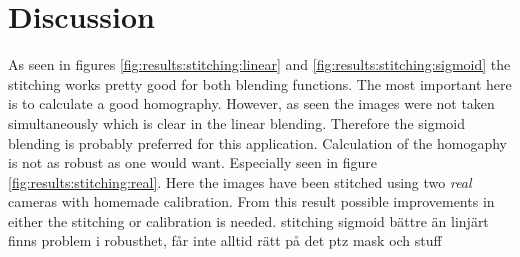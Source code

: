 \section{Discussion}
As seen in figures \ref{fig:results:stitching:linear} and \ref{fig:results:stitching:sigmoid} the stitching works pretty good for both blending functions. The most important here is to calculate a good homography. However, as seen the images were not taken simultaneously which is clear in the linear blending. Therefore the sigmoid blending is probably preferred for this application. Calculation of the homogaphy is not as robust as one would want. Especially seen in figure \ref{fig:results:stitching:real}. Here the images have been stitched using two {\it real} cameras with homemade calibration. From this result possible improvements in either the stitching or calibration is needed.
stitching
  sigmoid bättre än linjärt
  finns problem i robusthet, får inte alltid rätt på det
ptz
  mask och stuff
